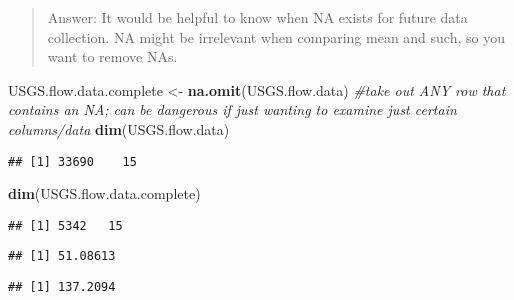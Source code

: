 \documentclass[]{article}
\newenvironment{Shaded}{\begin{snugshade}}{\end{snugshade}}
\newcommand{\CommentTok}[1]{\textcolor[rgb]{0.56,0.35,0.01}{\textit{#1}}}
\newcommand{\KeywordTok}[1]{\textcolor[rgb]{0.13,0.29,0.53}{\textbf{#1}}}
\newcommand{\NormalTok}[1]{#1}
\newcommand{\OperatorTok}[1]{\textcolor[rgb]{0.81,0.36,0.00}{\textbf{#1}}}
\newcommand{\StringTok}[1]{\textcolor[rgb]{0.31,0.60,0.02}{#1}}
\begin{document}
\begin{quote}
Answer: It would be helpful to know when NA exists for future data
collection. NA might be irrelevant when comparing mean and such, so you
want to remove NAs.
\end{quote}

\begin{Shaded}
\begin{Highlighting}[]
\NormalTok{USGS.flow.data.complete <-}\StringTok{ }\KeywordTok{na.omit}\NormalTok{(USGS.flow.data) }\CommentTok{#take out ANY row that contains an NA; can be dangerous if just wanting to examine just certain columns/data}
\KeywordTok{dim}\NormalTok{(USGS.flow.data)}
\end{Highlighting}
\end{Shaded}

\begin{verbatim}
## [1] 33690    15
\end{verbatim}

\begin{Shaded}
\begin{Highlighting}[]
\KeywordTok{dim}\NormalTok{(USGS.flow.data.complete) }
\end{Highlighting}
\end{Shaded}

\begin{verbatim}
## [1] 5342   15
\end{verbatim}

\begin{Shaded}
\end{Shaded}

\begin{verbatim}
## [1] 51.08613
\end{verbatim}

\begin{Shaded}
\end{Shaded}

\begin{verbatim}
## [1] 137.2094
\end{verbatim}

\begin{Shaded}
\end{Shaded}
\end{document}
